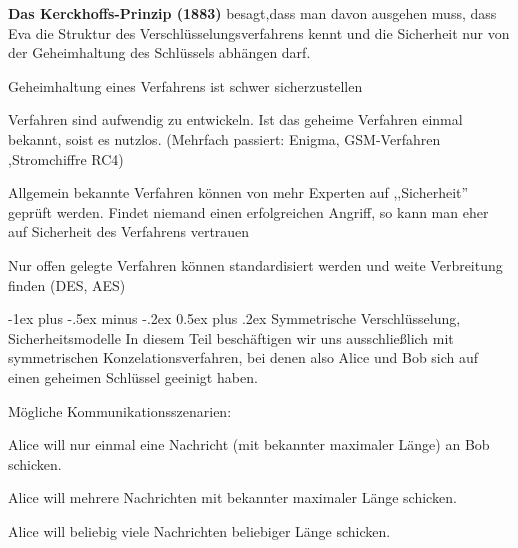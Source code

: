 \documentclass[a4paper]{article}
\makeatletter
\renewcommand{\note}[2]{\begin{noteBox} \textbf{#1} #2 \end{noteBox}}
\renewcommand{\section}{\@startsection{section}{1}{0mm}%
 {-1ex plus -.5ex minus -.2ex}%
 {0.5ex plus .2ex}%
 {\normalfont\large\bfseries}}
\makeatother
\begin{document}
\begin{multicols}{3}
    \note{Das Kerckhoffs-Prinzip (1883)}{
        besagt,dass man davon ausgehen muss, dass Eva die Struktur des Verschlüsselungsverfahrens kennt und die Sicherheit nur von der Geheimhaltung des Schlüssels abhängen darf.
        \begin{enumerate*}
            \item Geheimhaltung eines Verfahrens ist schwer sicherzustellen
            \item Verfahren sind aufwendig zu entwickeln. Ist das geheime Verfahren einmal bekannt, soist es nutzlos. (Mehrfach passiert: Enigma, GSM-Verfahren ,Stromchiffre RC4)
            \item Allgemein bekannte Verfahren können von mehr Experten auf ,,Sicherheit'' geprüft werden. Findet niemand einen erfolgreichen Angriff, so kann man eher auf Sicherheit des Verfahrens vertrauen
            \item Nur offen gelegte Verfahren können standardisiert werden und weite Verbreitung finden (DES, AES)
        \end{enumerate*}
    }

    \section{Symmetrische Verschlüsselung, Sicherheitsmodelle}
    In diesem Teil beschäftigen wir uns ausschließlich mit symmetrischen Konzelationsverfahren, bei denen also Alice und Bob sich auf einen geheimen Schlüssel geeinigt haben.

    Mögliche Kommunikationsszenarien:
    \begin{itemize*}
        \item Alice will nur einmal eine Nachricht (mit bekannter maximaler Länge) an Bob schicken.
        \item Alice will mehrere Nachrichten mit bekannter maximaler Länge schicken.
        \item Alice will beliebig viele Nachrichten beliebiger Länge schicken.
    \end{itemize*}


\end{multicols}
\end{document}
